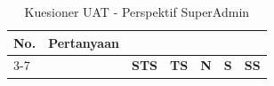 \begin{longtable}{|p{0.8cm}|p{7.5cm}|>{\centering\arraybackslash}p{0.8cm}|>{\centering\arraybackslash}p{0.8cm}|>{\centering\arraybackslash}p{0.8cm}|>{\centering\arraybackslash}p{0.8cm}|>{\centering\arraybackslash}p{0.8cm}|}
    \caption{Kuesioner UAT - Perspektif SuperAdmin} \label{tabel:uat_superadmin}                                                                                                                                                                                                        \\
    \hline
    \multirow{2}{*}{\textbf{No.}}              & \multirow{2}{*}{\textbf{Pertanyaan}}                                                                                                     & \multicolumn{5}{c|}{\textbf{Jawaban}}                                                       \\ \cline{3-7}
                                               &                                                                                                                                          & \textbf{STS}                          & \textbf{TS} & \textbf{N} & \textbf{S} & \textbf{SS} \\
    \hline
    \endfirsthead




\end{longtable}
